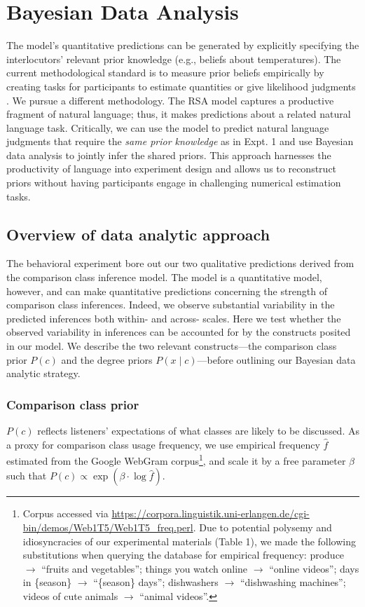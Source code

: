 \documentclass[doc]{apa6}
\begin{document}
\section{Bayesian Data Analysis}

The model's quantitative predictions can be generated by explicitly specifying the interlocutors' relevant prior knowledge (e.g., beliefs about temperatures). 
The current methodological standard is to measure prior beliefs empirically by creating tasks for participants to estimate quantities or give likelihood judgments \cite{Franke2016}. 
We pursue a different methodology. 
The RSA model captures a productive fragment of natural language; thus, it makes predictions about a related natural language task.
Critically, we can use the model to predict natural language judgments that require the \emph{same prior knowledge} as in Expt. 1 and use Bayesian data analysis to jointly infer the shared priors. 
This approach harnesses the productivity of language into experiment design and allows us to reconstruct priors without having participants engage in challenging numerical estimation tasks.

\subsection{Overview of data analytic approach}

The behavioral experiment bore out our two qualitative predictions
derived from the comparison class inference model. The model is a
quantitative model, however, and can make quantitative predictions
concerning the strength of comparison class inferences. Indeed, we
observe substantial variability in the predicted inferences both within-
and across- scales. Here we test whether the observed variability in
inferences can be accounted for by the constructs posited in our model.
We describe the two relevant constructs---the comparison class prior
\(P(c)\) and the degree priors \(P(x \mid c)\)---before outlining our
Bayesian data analytic strategy.

\subsubsection{Comparison class prior}

\(P(c)\) reflects listeners' expectations of what classes are likely to be discussed. As a proxy for comparison class usage frequency, we use empirical frequency \(\hat{f}\) estimated from the Google WebGram corpus\footnote{Corpus accessed via
\url{https://corpora.linguistik.uni-erlangen.de/cgi-bin/demos/Web1T5/Web1T5_freq.perl}. 
Due to potential polysemy and idiosyncracies of our experimental
  materials (Table 1), we made the following substitutions when querying
  the database for empirical frequency: produce $\rightarrow$
  ``fruits and vegetables''; things you watch online
  $\rightarrow$ ``online videos''; days in \{season\}
  $\rightarrow$ ``\{season\} days''; dishwashers $\rightarrow$
  ``dishwashing machines''; videos of cute animals $\rightarrow$
  ``animal videos''.}, and scale it by a free parameter $\beta$ such that $P(c) \propto \exp{(\beta \cdot \log \hat{f})}$.
\end{document}
